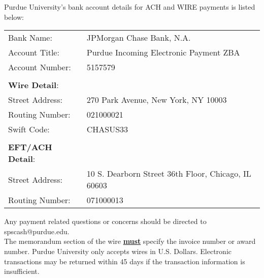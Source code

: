 Purdue University's bank account details for ACH and WIRE payments is listed
below:
\begin{table}[H]
    \centering
    \begin{tabular}{l l}
        Bank Name: 		    &JPMorgan Chase Bank, N.A.\\
        Account Title: 		&Purdue Incoming Electronic Payment ZBA\\
        Account Number: 	&5157579\\
        &\\
        \textbf{Wire Detail}:&\\
        Street Address: 	&270 Park Avenue, New York, NY 10003\\
        Routing Number: 	&021000021\\
        Swift Code: 		&CHASUS33\\
        &\\
        \textbf{EFT/ACH Detail}:&\\
        Street Address: 		&10 S. Dearborn Street 36th Floor, Chicago, IL 60603\\
        Routing Number: 	&071000013
    \end{tabular}
\end{table}

Any payment related questions or concerns should be directed to spscash@purdue.edu.\\

The memorandum section of the wire \textbf{\underline{must}} specify the invoice number or award number. Purdue University only accepts wires in U.S. Dollars. Electronic transactions may be returned within 45 days if the transaction information is insufficient.
